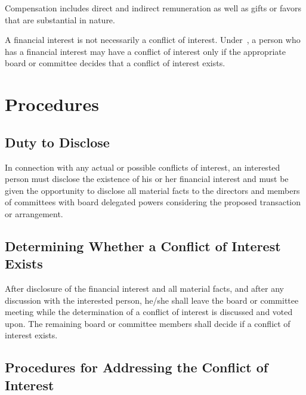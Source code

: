 \documentclass[12pt]{article}
\begin{document}
Compensation includes direct and indirect remuneration as well as gifts or favors that are substantial in nature. 

A financial interest is not necessarily a conflict of interest. Under~,  a person who has a financial interest may have a conflict of interest only if the appropriate board or committee decides that a conflict of interest exists. 

\section{Procedures}\label{sec:procedures}

\subsection{Duty to Disclose}

In connection with any actual or possible conflicts of interest, an interested person must disclose the existence of his or her financial interest and must be given the opportunity to disclose all material facts to the directors and members of committees with board delegated powers considering the proposed transaction or arrangement. 

\subsection{Determining Whether a Conflict of Interest Exists}\label{sec:conflict_exists}

After disclosure of the financial interest and all material facts, and after any discussion with the interested person, he/she shall leave the board or committee meeting while the determination of a conflict of interest is discussed and voted upon. The remaining board or committee members shall decide if a conflict of interest exists. 

\subsection{Procedures for Addressing the Conflict of Interest}
\end{document}
